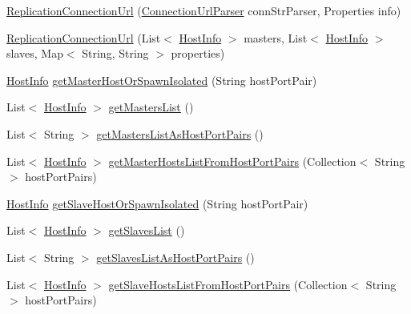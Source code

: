 \begin{DoxyCompactItemize}
\item 
\mbox{\hyperlink{classcom_1_1mysql_1_1cj_1_1conf_1_1url_1_1_replication_connection_url_a47f9dd61da2b65fffb464040033f39d1}{Replication\+Connection\+Url}} (\mbox{\hyperlink{classcom_1_1mysql_1_1cj_1_1conf_1_1_connection_url_parser}{Connection\+Url\+Parser}} conn\+Str\+Parser, Properties info)
\item 
\mbox{\hyperlink{classcom_1_1mysql_1_1cj_1_1conf_1_1url_1_1_replication_connection_url_a5f5fa218d72c2bdba66c694143ad568d}{Replication\+Connection\+Url}} (List$<$ \mbox{\hyperlink{classcom_1_1mysql_1_1cj_1_1conf_1_1_host_info}{Host\+Info}} $>$ masters, List$<$ \mbox{\hyperlink{classcom_1_1mysql_1_1cj_1_1conf_1_1_host_info}{Host\+Info}} $>$ slaves, Map$<$ String, String $>$ properties)
\item 
\mbox{\hyperlink{classcom_1_1mysql_1_1cj_1_1conf_1_1_host_info}{Host\+Info}} \mbox{\hyperlink{classcom_1_1mysql_1_1cj_1_1conf_1_1url_1_1_replication_connection_url_ab075191dbdcebb32ccbbe1eeb9896c1c}{get\+Master\+Host\+Or\+Spawn\+Isolated}} (String host\+Port\+Pair)
\item 
List$<$ \mbox{\hyperlink{classcom_1_1mysql_1_1cj_1_1conf_1_1_host_info}{Host\+Info}} $>$ \mbox{\hyperlink{classcom_1_1mysql_1_1cj_1_1conf_1_1url_1_1_replication_connection_url_aea588a641fe3e6352f0ca5c9940fc80a}{get\+Masters\+List}} ()
\item 
List$<$ String $>$ \mbox{\hyperlink{classcom_1_1mysql_1_1cj_1_1conf_1_1url_1_1_replication_connection_url_a23e035f89d2356bf7939b354266efc3d}{get\+Masters\+List\+As\+Host\+Port\+Pairs}} ()
\item 
List$<$ \mbox{\hyperlink{classcom_1_1mysql_1_1cj_1_1conf_1_1_host_info}{Host\+Info}} $>$ \mbox{\hyperlink{classcom_1_1mysql_1_1cj_1_1conf_1_1url_1_1_replication_connection_url_a210692bdc210c25db156b88f7024e8bb}{get\+Master\+Hosts\+List\+From\+Host\+Port\+Pairs}} (Collection$<$ String $>$ host\+Port\+Pairs)
\item 
\mbox{\hyperlink{classcom_1_1mysql_1_1cj_1_1conf_1_1_host_info}{Host\+Info}} \mbox{\hyperlink{classcom_1_1mysql_1_1cj_1_1conf_1_1url_1_1_replication_connection_url_a7f3ecb4637ad23b6731d2fc9f70c55dd}{get\+Slave\+Host\+Or\+Spawn\+Isolated}} (String host\+Port\+Pair)
\item 
List$<$ \mbox{\hyperlink{classcom_1_1mysql_1_1cj_1_1conf_1_1_host_info}{Host\+Info}} $>$ \mbox{\hyperlink{classcom_1_1mysql_1_1cj_1_1conf_1_1url_1_1_replication_connection_url_ad187e71f456d74a6e9d5533944a10489}{get\+Slaves\+List}} ()
\item 
List$<$ String $>$ \mbox{\hyperlink{classcom_1_1mysql_1_1cj_1_1conf_1_1url_1_1_replication_connection_url_aaf09eba8b7c2e3d417b6a9d4df7264a4}{get\+Slaves\+List\+As\+Host\+Port\+Pairs}} ()
\item 
List$<$ \mbox{\hyperlink{classcom_1_1mysql_1_1cj_1_1conf_1_1_host_info}{Host\+Info}} $>$ \mbox{\hyperlink{classcom_1_1mysql_1_1cj_1_1conf_1_1url_1_1_replication_connection_url_a8298b0962db02256dc6f0e6cbf475d8c}{get\+Slave\+Hosts\+List\+From\+Host\+Port\+Pairs}} (Collection$<$ String $>$ host\+Port\+Pairs)
\end{DoxyCompactItemize}
